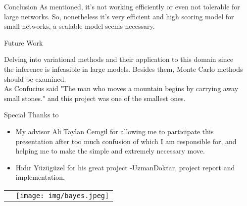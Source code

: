 \documentclass[final]{beamer}
\newlength{\sepwid}
\newlength{\onecolwid}
\begin{document}
\begin{frame}
\begin{columns}[t]
\begin{column}{\onecolwid} %



\begin{exampleblock}{Conclusion}
As mentioned, it's not working efficiently or even not tolerable for large networks. So, nonetheless it's very efficient and high scoring model for small networks, a scalable model seems necessary.


\end{exampleblock}



\begin{exampleblock}{Future Work}

Delving into variational methods and their application to this domain since the inference is infeasible in large models. Besides them, Monte Carlo methods should be examined. \\
As Confucius said "The man who moves a mountain begins by carrying away small stones." and this project was one of the smallest ones.


\end{exampleblock}

\begin{block}{Special Thanks to}

\begin{itemize}
\item My advisor Ali Taylan Cemgil for allowing me to participate this presentation after too much confusion of which I am responsible for, and helping me to make the simple and extremely necessary move.
\item H{\i}d{\i}r Y\"{u}z\"{u}g\"{u}zel for his great project -UzmanDoktar, project report and implementation.
\end{itemize}

\end{block}

\begin{tabular}{rr}
\hspace{0.02\linewidth} & \texttt{[image: img/bayes.jpeg]}
\end{tabular}


\end{column} %

\begin{column}{\sepwid}\end{column} %

\end{columns} %

\end{frame} %
\end{document}
